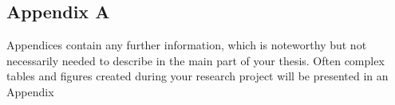 \chapter{}

\section*{Appendix A}

Appendices contain any further information, which is noteworthy but not necessarily needed to describe in the main part of your thesis. Often complex tables and figures created during your research project will be presented in an Appendix
